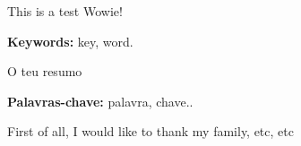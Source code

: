 


This is a test
Wowie!

\textbf{Keywords:} key, word.


O teu resumo

\textbf{Palavras-chave:} palavra, chave..



First of all, I would like to thank my family, etc, etc